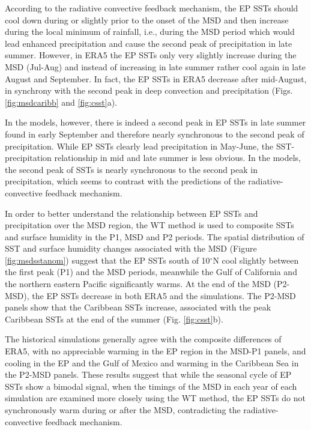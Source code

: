 According to the radiative convective feedback mechanism, the EP SSTs should cool down during or slightly prior to the onset of the MSD and then increase during the local minimum of rainfall, i.e., during the MSD period which would lead enhanced precipitation and cause the second peak of precipitation in late summer. However, in ERA5 the EP SSTs only very slightly increase during the MSD (Jul-Aug) and instead of increasing in late summer rather cool again in late August and September. In fact, the EP SSTs in ERA5 decrease after mid-August, in synchrony with the second peak in deep convection and precipitation (Figs. \ref{fig:msdcaribb} and \ref{fig:csst}a).

 In the models, however, there is indeed a second peak in EP SSTs in late summer found in early September and therefore nearly synchronous to the second peak of precipitation. While EP SSTs clearly lead precipitation in May-June, the SST-precipitation relationship in mid and late summer is less obvious. In the models, the second peak of SSTs is nearly synchronous to the second peak in precipitation, which seems to contrast with the predictions of the radiative-convective feedback mechanism.
 
In order to better understand the relationship between EP SSTs and precipitation over the MSD region, the WT method is used to composite SSTs and surface humidity in the P1, MSD and P2 periods. 
The spatial distribution of SST and surface humidity changes associated with the MSD  (Figure \ref{fig:msdsstanom}) suggest that the EP SSTs south of 10$^\circ$N cool slightly between the first peak (P1) and the MSD periods, meanwhile the Gulf of California and the northern eastern Pacific significantly warms. At the end of the MSD (P2-MSD), the EP SSTs decrease in both ERA5 and the simulations. 
The P2-MSD panels show that the Caribbean SSTs increase, associated with the peak Caribbean SSTs  at the end of the summer (Fig. \ref{fig:csst}b).

The historical simulations generally agree with the composite differences of ERA5, with no appreciable warming in the EP region in the MSD-P1 panels, and cooling in the EP and the Gulf of Mexico and warming in the Caribbean Sea in the P2-MSD panels.
These results suggest that while the seasonal cycle of EP SSTs show a bimodal signal, when the timings of the MSD in each year of each simulation are examined more closely using the WT method, the EP SSTs do not synchronously warm during or after the MSD, contradicting the radiative-convective feedback mechanism.


